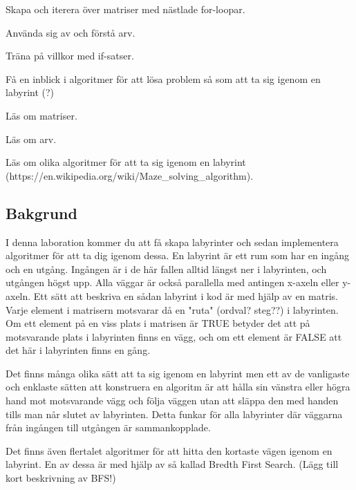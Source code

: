 

\Lab{\LabWeekNINE}

\begin{Goals}
\item Skapa och iterera över matriser med nästlade for-loopar.
\item Använda sig av och förstå arv.
\item Träna på villkor med if-satser.
\item Få en inblick i algoritmer för att lösa problem så som att ta sig igenom en labyrint (?)
\end{Goals}

\begin{Preparations}
\item Läs om matriser.
\item Läs om arv.
\item Läs om olika algoritmer för att ta sig igenom en labyrint (https://en.wikipedia.org/wiki/Maze\_solving\_algorithm).
\end{Preparations}

\subsection{Bakgrund}
I denna laboration kommer du att få skapa labyrinter och sedan implementera algoritmer för att ta dig igenom dessa. En labyrint är ett rum som har en ingång och en utgång. Ingången är i de här fallen alltid längst ner i labyrinten, och utgången högst upp. Alla väggar är också parallella med antingen x-axeln eller y-axeln. Ett sätt att beskriva en sådan labyrint i kod är med hjälp av en matris. Varje element i matrisern motsvarar då en "ruta" (ordval? steg??) i labyrinten. Om ett element på en viss plats i matrisen är TRUE betyder det att på motsvarande plats i labyrinten finns en vägg, och om ett element är FALSE att det här i labyrinten finns en gång.

Det finns många olika sätt att ta sig igenom en labyrint men ett av de vanligaste och enklaste sätten att konstruera en algoritm är att hålla sin vänstra eller högra hand mot motsvarande vägg och följa väggen utan att släppa den med handen tills man når slutet av labyrinten. Detta funkar för alla labyrinter där väggarna från ingången till utgången är sammankopplade.

Det finns även flertalet algoritmer för att hitta den kortaste vägen igenom en labyrint. En av dessa är med hjälp av så kallad Bredth First Search. (Lägg till kort beskrivning av BFS!)


